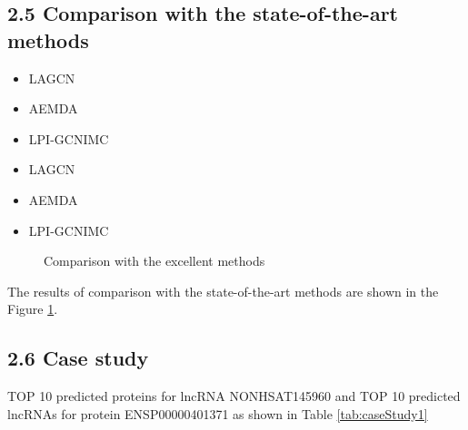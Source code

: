 \documentclass[fleqn,10pt]{wlscirep}
\begin{document}
\subsection*{2.5 Comparison with the state-of-the-art methods}

\begin{itemize}
\item LAGCN
\item AEMDA
\item LPI-GCNIMC
\end{itemize}

\begin{itemize}
\item LAGCN
\item AEMDA
\item LPI-GCNIMC
\end{itemize}

\begin{figure}[ht]
\centering
{}
\caption{Comparison with the excellent methods}
\label{Fig.lable3}
\end{figure}

The results of comparison with the state-of-the-art methods are shown in the Figure \ref{Fig.lable3}.

\subsection*{2.6 Case study}
TOP 10 predicted proteins for lncRNA NONHSAT145960 and TOP 10 predicted lncRNAs for protein ENSP00000401371 as shown in Table \ref{tab:caseStudy1}
\end{document}
